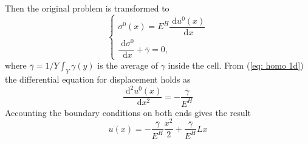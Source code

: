 \documentclass[10pt,a4paper]{scrreprt}
\newcommand{\myd}{\;\mathrm{d}}
\begin{document}
Then the original problem is transformed to
\begin{equation}
\label{eq: homo 1d}
\left\{
\begin{array}{l}
\sigma^{0}(x) = E^{H} \dfrac{\myd{u^{0}(x)}}{\myd{x}} \\
\dfrac{\myd{\sigma^{0}}}{\myd{x}} + \bar{\gamma} = 0,
\end{array}
\right.
\end{equation}
where $\bar{\gamma}=1/Y \int_{Y} \gamma(y)$ is the average of $\gamma$ inside the cell. From (\ref{eq: homo 1d}) the differential equation for displacement holds as
\begin{equation}
\dfrac{\myd^2 u^{0}(x)}{\myd{x^{2}}} = -\dfrac{\bar{\gamma}}{E^{H}}
\end{equation}
Accounting the boundary conditions on both ends gives the result
\[u(x) = -\dfrac{\bar{\gamma}}{E^{H}} \dfrac{x^{2}}{2} + \dfrac{\bar{\gamma}}{E^{H}} Lx \]
\end{document}
